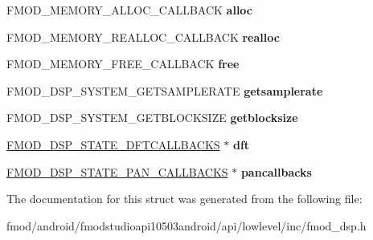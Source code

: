 \begin{DoxyCompactItemize}
\item 
\hypertarget{struct_f_m_o_d___d_s_p___s_t_a_t_e___s_y_s_t_e_m_c_a_l_l_b_a_c_k_s_ad3bef50d2425783451b5e88aafd7b8a1}{F\+M\+O\+D\+\_\+\+M\+E\+M\+O\+R\+Y\+\_\+\+A\+L\+L\+O\+C\+\_\+\+C\+A\+L\+L\+B\+A\+C\+K {\bfseries alloc}}\label{struct_f_m_o_d___d_s_p___s_t_a_t_e___s_y_s_t_e_m_c_a_l_l_b_a_c_k_s_ad3bef50d2425783451b5e88aafd7b8a1}

\item 
\hypertarget{struct_f_m_o_d___d_s_p___s_t_a_t_e___s_y_s_t_e_m_c_a_l_l_b_a_c_k_s_a25d94a409c725ccaea9267577966d04a}{F\+M\+O\+D\+\_\+\+M\+E\+M\+O\+R\+Y\+\_\+\+R\+E\+A\+L\+L\+O\+C\+\_\+\+C\+A\+L\+L\+B\+A\+C\+K {\bfseries realloc}}\label{struct_f_m_o_d___d_s_p___s_t_a_t_e___s_y_s_t_e_m_c_a_l_l_b_a_c_k_s_a25d94a409c725ccaea9267577966d04a}

\item 
\hypertarget{struct_f_m_o_d___d_s_p___s_t_a_t_e___s_y_s_t_e_m_c_a_l_l_b_a_c_k_s_af672bd67d86b20fb59f3f6f93297e888}{F\+M\+O\+D\+\_\+\+M\+E\+M\+O\+R\+Y\+\_\+\+F\+R\+E\+E\+\_\+\+C\+A\+L\+L\+B\+A\+C\+K {\bfseries free}}\label{struct_f_m_o_d___d_s_p___s_t_a_t_e___s_y_s_t_e_m_c_a_l_l_b_a_c_k_s_af672bd67d86b20fb59f3f6f93297e888}

\item 
\hypertarget{struct_f_m_o_d___d_s_p___s_t_a_t_e___s_y_s_t_e_m_c_a_l_l_b_a_c_k_s_a24e5b8fc74c3c1cc4a9b883d3e176a42}{F\+M\+O\+D\+\_\+\+D\+S\+P\+\_\+\+S\+Y\+S\+T\+E\+M\+\_\+\+G\+E\+T\+S\+A\+M\+P\+L\+E\+R\+A\+T\+E {\bfseries getsamplerate}}\label{struct_f_m_o_d___d_s_p___s_t_a_t_e___s_y_s_t_e_m_c_a_l_l_b_a_c_k_s_a24e5b8fc74c3c1cc4a9b883d3e176a42}

\item 
\hypertarget{struct_f_m_o_d___d_s_p___s_t_a_t_e___s_y_s_t_e_m_c_a_l_l_b_a_c_k_s_ae8cf757a83d6859c03798fd958e1825c}{F\+M\+O\+D\+\_\+\+D\+S\+P\+\_\+\+S\+Y\+S\+T\+E\+M\+\_\+\+G\+E\+T\+B\+L\+O\+C\+K\+S\+I\+Z\+E {\bfseries getblocksize}}\label{struct_f_m_o_d___d_s_p___s_t_a_t_e___s_y_s_t_e_m_c_a_l_l_b_a_c_k_s_ae8cf757a83d6859c03798fd958e1825c}

\item 
\hypertarget{struct_f_m_o_d___d_s_p___s_t_a_t_e___s_y_s_t_e_m_c_a_l_l_b_a_c_k_s_afbf919f4e42ceffe427e4ca030f180eb}{\hyperlink{struct_f_m_o_d___d_s_p___s_t_a_t_e___d_f_t_c_a_l_l_b_a_c_k_s}{F\+M\+O\+D\+\_\+\+D\+S\+P\+\_\+\+S\+T\+A\+T\+E\+\_\+\+D\+F\+T\+C\+A\+L\+L\+B\+A\+C\+K\+S} $\ast$ {\bfseries dft}}\label{struct_f_m_o_d___d_s_p___s_t_a_t_e___s_y_s_t_e_m_c_a_l_l_b_a_c_k_s_afbf919f4e42ceffe427e4ca030f180eb}

\item 
\hypertarget{struct_f_m_o_d___d_s_p___s_t_a_t_e___s_y_s_t_e_m_c_a_l_l_b_a_c_k_s_a6b4516767d5b65dbb97269b59b5b6634}{\hyperlink{struct_f_m_o_d___d_s_p___s_t_a_t_e___p_a_n___c_a_l_l_b_a_c_k_s}{F\+M\+O\+D\+\_\+\+D\+S\+P\+\_\+\+S\+T\+A\+T\+E\+\_\+\+P\+A\+N\+\_\+\+C\+A\+L\+L\+B\+A\+C\+K\+S} $\ast$ {\bfseries pancallbacks}}\label{struct_f_m_o_d___d_s_p___s_t_a_t_e___s_y_s_t_e_m_c_a_l_l_b_a_c_k_s_a6b4516767d5b65dbb97269b59b5b6634}

\end{DoxyCompactItemize}


The documentation for this struct was generated from the following file\+:\begin{DoxyCompactItemize}
\item 
fmod/android/fmodstudioapi10503android/api/lowlevel/inc/fmod\+\_\+dsp.\+h\end{DoxyCompactItemize}
